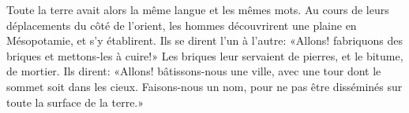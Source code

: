 Toute la terre avait alors la même langue et les mêmes mots.
Au cours de leurs déplacements du côté de l’orient,
	les hommes découvrirent une plaine en Mésopotamie, et s’y établirent.
Ils se dirent l’un à l’autre:
	«Allons! fabriquons des briques et mettons-les à cuire!»
Les briques leur servaient de pierres, et le bitume, de mortier.
Ils dirent: «Allons! bâtissons-nous une ville,
	avec une tour dont le sommet soit dans les cieux.
	Faisons-nous un nom, pour ne pas être disséminés sur toute la surface de la terre.»

